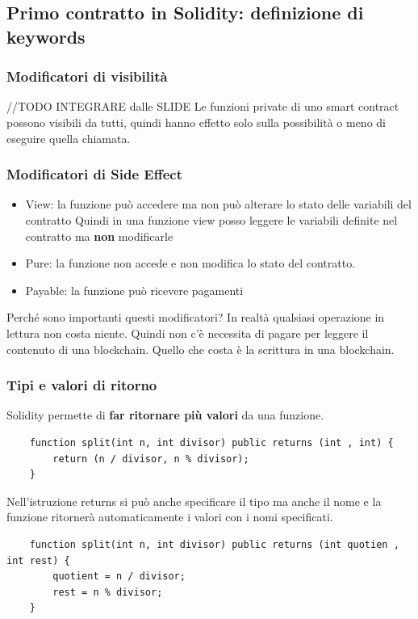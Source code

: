 \documentclass[a4paper]{article}
\begin{document}
\subsection{Primo contratto in Solidity: definizione di keywords}

\subsubsection{Modificatori di visibilità}

//TODO INTEGRARE dalle SLIDE
Le funzioni private di uno smart contract possono visibili da tutti, quindi hanno effetto solo sulla possibilità
o meno di eseguire quella chiamata.

\subsubsection{Modificatori di Side Effect}

\begin{itemize}
    \item View: la funzione può accedere ma non può alterare lo stato delle variabili del contratto
    Quindi in una funzione view posso leggere le variabili definite nel contratto ma \textbf{non} modificarle
    \item Pure: la funzione non accede e non modifica lo stato del contratto.
    \item Payable: la funzione può ricevere pagamenti
\end{itemize}

Perché sono importanti questi modificatori? In realtà qualsiasi operazione
in lettura non costa niente. Quindi non c'è necessita di pagare per leggere il contenuto di una blockchain.
Quello che costa è la scrittura in una blockchain. 

\subsubsection{Tipi e valori di ritorno}

Solidity permette di \textbf{far ritornare più valori} da una funzione.
\begin{lstlisting}
    function split(int n, int divisor) public returns (int , int) {
        return (n / divisor, n % divisor);
    }
\end{lstlisting}
\noindent
Nell'istruzione returns si può anche specificare il tipo ma anche il nome e la funzione ritornerà
automaticamente i valori con i nomi specificati.
\begin{lstlisting}
    function split(int n, int divisor) public returns (int quotien , int rest) {
        quotient = n / divisor;
        rest = n % divisor;
    }
\end{lstlisting}
\end{document}
